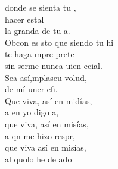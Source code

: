 \begin{cancion}
	donde  se sienta tu ,\\
	hacer estal\\
	la granda de tu a.\\
	Obcon es sto que siendo tu hi\\
	te haga mpre prete\\
	sin serme nunca uien ecial.\\
	Sea así,mplaseu volud, \\
	 de mí uner efi.\\
	Que viva, así en midías,\\
	a en yo digo a,\\
	que viva, así en misías,\\
	a qn me hizo respr,\\
	que viva así en misías,\\
	al quolo he de ado\\
	       \\
\end{cancion}%
